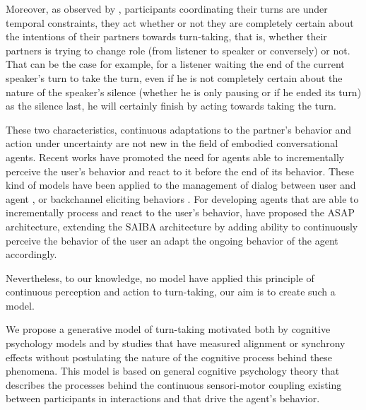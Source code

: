  Moreover, as observed by \cite{thorisson_natural_2002}, participants coordinating their turns are under temporal constraints, they act whether or not they are completely certain about the intentions of their partners towards turn-taking, that is, whether their partners is trying to change role (from listener to speaker or conversely) or not. That can be the case for example, for a listener waiting the end of the current speaker's turn to take the turn, even if he is not completely certain about the nature of the speaker's silence (whether he is only pausing or if he ended its turn) as the silence last, he will certainly finish by acting towards taking the turn.
 	
 These two characteristics, continuous adaptations to the partner's behavior and action under uncertainty are not new in the field of embodied conversational agents. Recent works have promoted the need for agents able to incrementally perceive the user's behavior and react to it before the end of its behavior. These kind of models have been applied to the management of dialog between user and agent \cite{skantze_towards_2010}, or backchannel eliciting behaviors \cite{buschmeier_when_2014}. For developing agents that are able to incrementally process and react to the user's behavior, \cite{kopp_architecture_2014} have proposed the ASAP architecture, extending the SAIBA architecture by adding ability to continuously perceive the behavior of the user an adapt the ongoing behavior of the agent accordingly. 
 
 Nevertheless, to our knowledge, no model have applied this principle of continuous perception and action to turn-taking, our aim is to create such a model. 

We propose a generative model of turn-taking motivated both by cognitive psychology models and by studies
that have measured alignment or synchrony effects without postulating the nature of the cognitive process
behind these phenomena. This model is based on general cognitive psychology theory that describes the
processes behind the continuous sensori-motor coupling existing between participants in interactions and that
drive the agent's behavior.



